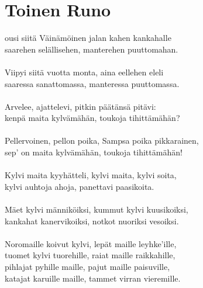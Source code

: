 
\chapter*{Toinen Runo}

ousi siitä Väinämöinen jalan kahen kankahalle				\\
saarehen selällisehen, manterehen puuttomahan.                  \\
                                                                \\
Viipyi siitä vuotta monta, aina eellehen eleli                  \\
saaressa sanattomassa, manteressa puuttomassa.                  \\
                                                                \\
Arvelee, ajattelevi, pitkin päätänsä pitävi:                    \\
kenpä maita kylvämähän, toukoja tihittämähän?                   \\
                                                                \\
Pellervoinen, pellon poika, Sampsa poika pikkarainen,           \\
sep' on maita kylvämähän, toukoja tihittämähän!                 \\
                                                                \\
Kylvi maita kyyhätteli, kylvi maita, kylvi soita,               \\
kylvi auhtoja ahoja, panettavi paasikoita.                      \\
                                                                \\
Mäet kylvi männiköiksi, kummut kylvi kuusikoiksi,               \\
kankahat kanervikoiksi, notkot nuoriksi vesoiksi.               \\
                                                                \\
Noromaille koivut kylvi, lepät maille leyhke'ille,              \\
tuomet kylvi tuorehille, raiat maille raikkahille,              \\
pihlajat pyhille maille, pajut maille paisuville,               \\
katajat karuille maille, tammet virran vieremille.              \\
